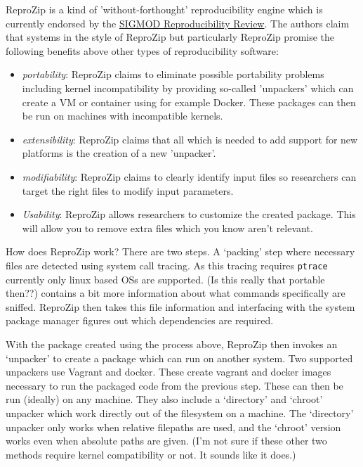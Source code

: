 \documentclass[american]{article}
\begin{document}
ReproZip is a kind of 'without-forthought' reproducibility engine which is currently endorsed by the \href{http://db-reproducibility.seas.harvard.edu/}{SIGMOD Reproducibility Review}. The authors claim that systems in the style of ReproZip but particularly ReproZip promise the following benefits above other types of reproducibility software\cite{reprozip}:

\begin{itemize}
\item \textit{portability}: ReproZip claims to eliminate possible portability problems including kernel incompatibility by providing so-called 'unpackers' which can create a VM or container using for example Docker. These packages can then be run on machines with incompatible kernels.\cite{reprozip}
\item \textit{extensibility}: ReproZip claims that all which is needed to add support for new platforms is the creation of a new 'unpacker'.\cite{reprozip}
\item \textit{modifiability}: ReproZip claims to clearly identify input files so researchers can target the right files to modify input parameters.\cite{reprozip}
\item \textit{Usability}: ReproZip allows researchers to customize the created package. This will allow you to remove extra files which you know aren't relevant.\cite{reprozip}
\end{itemize}

How does ReproZip work? There are two steps. A `packing' step where necessary files are detected using system call tracing. As this tracing requires \texttt{ptrace} currently only linux based OSs are supported\cite{reprozip}. (Is this really that portable then??) \cite{reprozip} contains a bit more information about what commands specifically are sniffed. ReproZip then takes this file information and interfacing with the system package manager figures out which dependencies are required.

With the package created using the process above, ReproZip then invokes an `unpacker' to create a package which can run on another system. Two supported unpackers use Vagrant and docker. These create vagrant and docker images necessary to run the packaged code from the previous step. These can then be run (ideally) on any machine. They also include a `directory' and `chroot' unpacker which work directly out of the filesystem on a machine. The `directory' unpacker only works when relative filepaths are used, and the `chroot' version works even when absolute paths are given. (I'm not sure if these other two methods require kernel compatibility or not. It sounds like it does.) \cite{reprozip}
\end{document}
